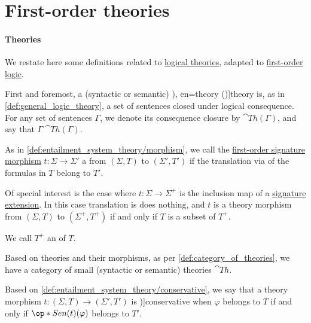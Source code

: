 \section{First-order theories}\label{sec:first_order_theories}

\paragraph{Theories}

\begin{definition}\label{def:fol_theory}\mimprovised
  We restate here some definitions related to \hyperref[def:logical_theory]{logical theories}, adapted to \hyperref[def:first_order_logic]{first-order logic}.

  First and foremost, a (syntactic or semantic) \term[ru=теория (\cite[def. 3.1.1]{Герасимов2014Вычислимость}), en=theory (\cite[def. 2.4.1]{Hinman2005Logic})]{theory} is, as in \cref{def:general_logic_theory}, a set of sentences closed under logical consequence. For any set of sentences \( \Gamma \), we denote its consequence closure by \( \cat{Th}(\Gamma) \), and say that \( \Gamma \)  \( \cat{Th}(\Gamma) \).

  \begin{thmenum}
     As in \cref{def:entailment_system_theory/morphism}, we call the \hyperref[def:fol_signature_category/morphisms]{first-order signature morphism} \( t: \Sigma \to \Sigma' \) a  from \( (\Sigma, T) \) to \( (\Sigma', T') \) if the translation via  of the formulas in \( T \) belong to \( T' \).

     Of special interest is the case where \( t: \Sigma \to \Sigma^+ \) is the inclusion map of a \hyperref[def:fol_signature_extension]{signature extension}. In this case translation is does nothing, and \( t \) is a theory morphism from \( (\Sigma, T) \) to \( (\Sigma^+, T^+) \) if and only if \( T \) is a subset of \( T^+ \).

    We call \( T^+ \) an  of \( T \).

     Based on theories and their morphisms, as per \cref{def:category_of_theories}, we have a category of small (syntactic or semantic) theories \( \cat{Th} \).

     Based on \cref{def:entailment_system_theory/conservative}, we say that a theory morphism \( t: (\Sigma, T) \to (\Sigma', T') \) is \term[en=conservative extension (\cite[180]{Hinman2005Logic})]{conservative} when \( \varphi \) belongs to \( T \) if and only if \( \op*{Sen}(t)(\varphi) \) belongs to \( T' \).


\end{thmenum}
\end{definition}
